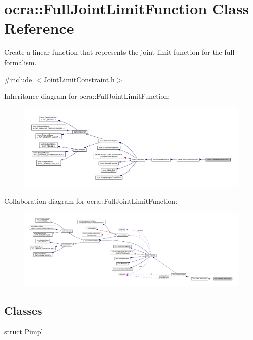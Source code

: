 \hypertarget{classocra_1_1FullJointLimitFunction}{}\section{ocra\+:\+:Full\+Joint\+Limit\+Function Class Reference}
\label{classocra_1_1FullJointLimitFunction}


Create a linear function that represents the joint limit function for the full formalism.  




{\ttfamily \#include $<$Joint\+Limit\+Constraint.\+h$>$}



Inheritance diagram for ocra\+:\+:Full\+Joint\+Limit\+Function\+:
\nopagebreak
\begin{figure}[H]
\begin{center}
\leavevmode
\includegraphics[width=350pt]{df/d87/classocra_1_1FullJointLimitFunction__inherit__graph}
\end{center}
\end{figure}


Collaboration diagram for ocra\+:\+:Full\+Joint\+Limit\+Function\+:
\nopagebreak
\begin{figure}[H]
\begin{center}
\leavevmode
\includegraphics[width=350pt]{db/d17/classocra_1_1FullJointLimitFunction__coll__graph}
\end{center}
\end{figure}
\subsection*{Classes}
\begin{DoxyCompactItemize}
\item 
struct \hyperlink{structFullJointLimitFunction_1_1Pimpl}{Pimpl}
\end{DoxyCompactItemize}
